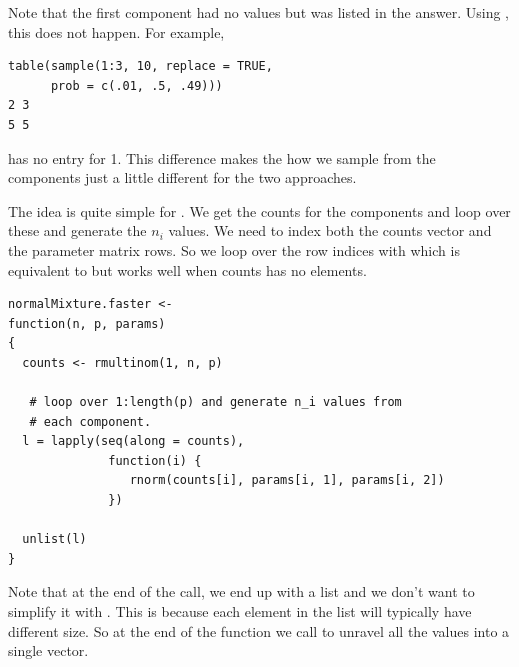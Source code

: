Note that the first component had no values but was listed
in the answer.
Using , this does not happen.
For example, 
\begin{verbatim}
table(sample(1:3, 10, replace = TRUE,
      prob = c(.01, .5, .49)))
2 3 
5 5 
\end{verbatim}
has no entry for 1.
This difference makes the how we sample from the components
just a little different for the two approaches.

The idea is quite simple for .
We get the counts for the components and loop
over these and generate the $n_i$ values.
We need to index both the counts vector and 
the parameter matrix rows.
So we loop over the row indices
with 
which is equivalent to 
but works well when counts has no elements.
{\footnotesize{
\begin{verbatim}
normalMixture.faster <-
function(n, p, params)
{
  counts <- rmultinom(1, n, p)

   # loop over 1:length(p) and generate n_i values from 
   # each component.
  l = lapply(seq(along = counts),
              function(i) {
                 rnorm(counts[i], params[i, 1], params[i, 2])
              }) 

  unlist(l)
}
\end{verbatim}
}}
Note that at the end of the  call, we end up with a
list and we don't want to simplify it with . This is
because each element in the list will typically have different size.
So at the end of the function we call  to unravel
all the values into a single vector.


